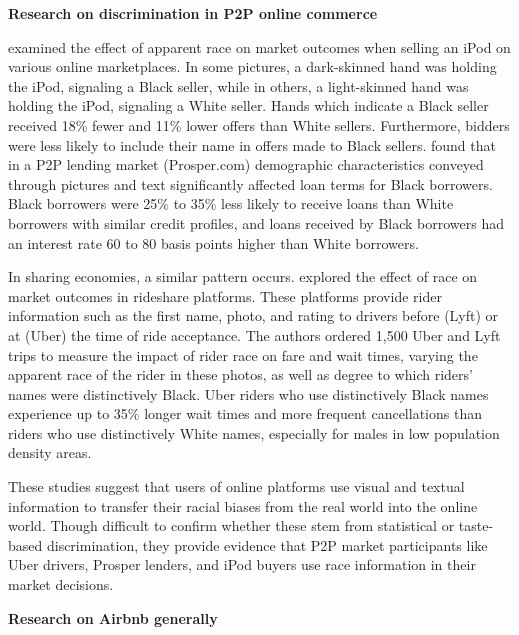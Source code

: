 \vspace{5mm}
\textbf{Research on discrimination in P2P online commerce}

\cite{doleac} examined the effect of apparent race on market outcomes when selling an iPod on various online marketplaces. In some pictures, a dark-skinned hand was holding the iPod, signaling a Black seller, while in others, a light-skinned hand was holding the iPod, signaling a White seller. Hands which indicate a Black seller received 18\% fewer and 11\% lower offers than White sellers. Furthermore, bidders were less likely to include their name in offers made to Black sellers. \cite{pope} found that in a P2P lending market (Prosper.com) demographic characteristics conveyed through pictures and text significantly affected loan terms for Black borrowers. Black borrowers were 25\% to 35\% less likely to receive loans than White borrowers with similar credit profiles, and loans received by Black borrowers had an interest rate 60 to 80 basis points higher than White borrowers.

In sharing economies, a similar pattern occurs. \cite{knittel} explored the effect of race on market outcomes in rideshare platforms. These platforms provide rider information such as the first name, photo, and rating to drivers before (Lyft) or at (Uber) the time of ride acceptance. The authors ordered 1,500 Uber and Lyft trips to measure the impact of rider race on fare and wait times, varying the apparent race of the rider in these photos, as well as degree to which riders’ names were distinctively Black. Uber riders who use distinctively Black names experience up to 35\% longer wait times and more frequent cancellations than riders who use distinctively White names, especially for males in low population density areas.

These studies suggest that users of online platforms use visual and textual information to transfer their racial biases from the real world into the online world. Though difficult to confirm whether these stem from statistical or taste-based discrimination, they provide evidence that P2P market participants like Uber drivers, Prosper lenders, and iPod buyers use race information in their market decisions. 



\vspace{5mm}
\textbf{Research on Airbnb generally}

